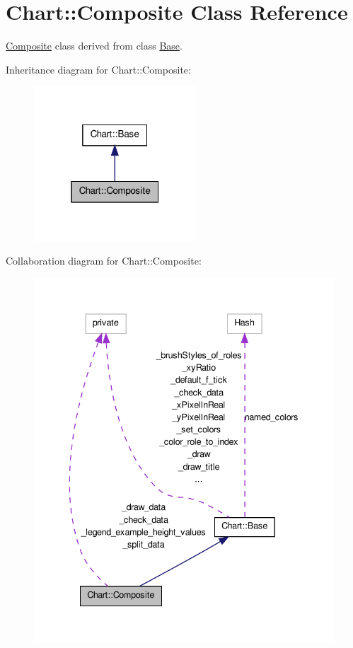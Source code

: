 \hypertarget{classChart_1_1Composite}{
\section{Chart::Composite Class Reference}
\label{classChart_1_1Composite}
}


\hyperlink{classChart_1_1Composite}{Composite} class derived from class \hyperlink{classChart_1_1Base}{Base}.  




Inheritance diagram for Chart::Composite:\nopagebreak
\begin{figure}[H]
\begin{center}
\leavevmode
\includegraphics[width=172pt]{classChart_1_1Composite__inherit__graph}
\end{center}
\end{figure}


Collaboration diagram for Chart::Composite:\nopagebreak
\begin{figure}[H]
\begin{center}
\leavevmode
\includegraphics[width=339pt]{classChart_1_1Composite__coll__graph}
\end{center}
\end{figure}
